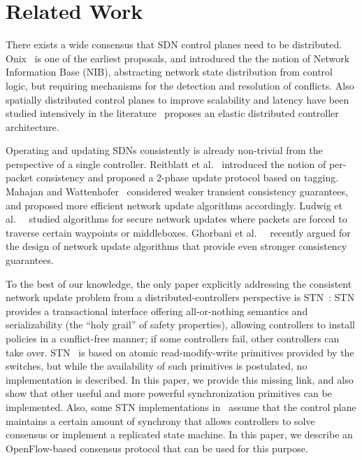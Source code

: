 \documentclass[conference]{sigcomm-alternate}
\begin{document}

\section{Related Work}\label{sec:relwork}

There exists a wide consensus that SDN control planes need to be distributed.~\cite{onos,onix,elasticon}
Onix~\cite{onix} is one of the earliest proposals, and introduced the
the notion of Network Information Base (NIB), abstracting network state
distribution from control logic, but
requiring mechanisms for the detection and resolution of conflicts.
Also spatially distributed control planes to improve scalability and
latency have been studied intensively
in the literature~\cite{kandoo,ctrl-place,hotsdn13loc}
proposes an elastic distributed controller architecture.

Operating and updating SDNs consistently is already non-trivial
from the perspective of a single controller. Reitblatt et al.~\cite{network-update}
introduced the notion of
per-packet consistency and proposed a 2-phase update protocol based on tagging.
Mahajan and Wattenhofer~\cite{roger-hotnets} considered weaker transient
consistency guarantees, and proposed more efficient network update algorithms
accordingly. Ludwig et al.~~\cite{hotnets14update} studied algorithms for secure
network updates where packets are forced to traverse certain waypoints or
middleboxes. Ghorbani et al.~~\cite{correct-virt} recently argued for the design
of network update algorithms that provide even stronger consistency guarantees.

To the best of our knowledge, the only paper explicitly addressing the consistent
network update problem from a distributed-controllers perspective is STN~\cite{stn}:
STN provides a transactional interface offering all-or-nothing semantics and serializability
(the ``holy grail'' of safety properties), allowing
controllers to install policies in a conflict-free manner; if some controllers fail,
other controllers can take over. STN~\cite{stn} is based on
atomic read-modify-write primitives provided by the switches, but
while the availability of such primitives is postulated, no implementation is
described. In this paper, we provide this missing link, and also show that other useful and
more powerful synchronization primitives can be implemented.
Also, some STN implementations in~\cite{stn} assume that the control
plane maintains a certain amount of synchrony that allows controllers
to solve consensus or implement a replicated state machine.
In this paper, we describe an OpenFlow-based consensus protocol that
can be used for this purpose.
\end{document}
